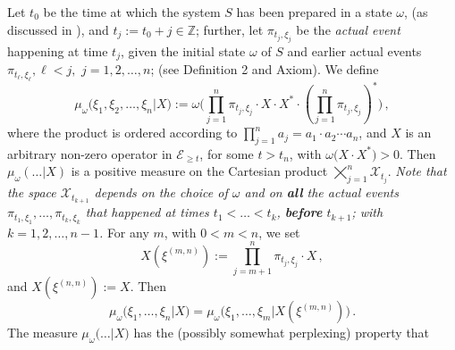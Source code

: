 \documentclass[12pt]{article}
\begin{document}
Let $t_0$ be the time at which the system $S$ has been prepared in a state $\omega$, (as discussed in \cite{FS-state-prep}), and $t_j:=t_0 + j \in \mathbb{Z}$; further, let $\pi_{t_j, \xi_j}$ be the \textit{actual event} happening at time $t_j$, given the initial state $\omega$ of $S$ and earlier actual events $\pi_{t_\ell, \xi_{\ell}}, \ell < j,$ $j=1,2, \dots, n$; (see Definition 2 and Axiom). We define 
\begin{equation}\label{Mu_omega}
\mu_{\omega}\big(\xi_1, \xi_2, \dots, \xi_n\vert X\big):= \omega\Big(\prod_{j=1}^{n} \pi_{t_j, \xi_j}\cdot X\cdot X^{*} \cdot (\prod_{j=1}^{n}\pi_{t_j, \xi_j})^{*}\Big)\,,
\end{equation}
where the product is ordered according to $\prod_{j=1}^{n} a_{j} = a_1 \cdot a_2 \cdots a_n$, and $X$ is an arbitrary non-zero operator in $\mathcal{E}_{\geq t}$, for some $t> t_n$, with $\omega\big(X\cdot X^{*}\big)>0$.
Then $\mu_{\omega}(\dots \vert X)$ is a positive measure on the Cartesian product ${\bigtimes}_{j=1}^{n} \mathcal{X}_{t_j}$. \textit{Note that the space $\mathcal{X}_{t_{k+1}}$ depends on the choice of $\omega$ and on {\bf{all}} the actual events $\pi_{t_1,\xi_1}, \dots, \pi_{t_{k},\xi_{k}}$ that happened at times $t_1 <\dots < t_k$, {\bf{before}} $t_{k+1}$; with $k=1,2, \dots, n-1$.} For any $m$, with $0<m<n$, we set
$$X({\xi}^{(m,n)}):= \prod_{j=m+1}^{n} \pi_{t_j, \xi_j} \cdot X\,,$$
and $X({\xi}^{(n,n)}):=X$. Then 
$$\mu_{\omega}\big(\xi_1,\dots,\xi_n \vert X\big)= \mu_{\omega}\big(\xi_1, \dots, \xi_m \vert X({\xi}^{(m,n)})\big)\,.$$
The measure 
$\mu_{\omega}\big(\dots \vert X\big)$ has the (possibly somewhat perplexing) property that\\
\end{document}
